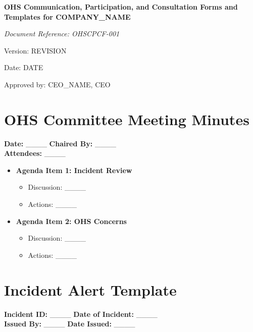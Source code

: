 \documentclass[12pt]{article}
\begin{document}
\begin{titlepage}
    \centering
    \vspace*{2cm}
    {\LARGE\bfseries OHS Communication, Participation, and Consultation Forms and Templates for {{COMPANY_NAME}}\par}
    \vspace{1cm}
    {\large\itshape Document Reference: OHSCPCF-001\par}
    \vspace{0.5cm}
    {\normalsize Version: {{REVISION}}\par}
    \vspace{0.5cm}
    {\normalsize Date: {{DATE}}\par}
    \vspace{2cm}
    {\normalsize Approved by: {{CEO_NAME}}, CEO\par}
\end{titlepage}

\section{OHS Committee Meeting Minutes}

\textbf{Date:} \_\_\_\_ \textbf{Chaired By:} \_\_\_\_\\
\textbf{Attendees:} \_\_\_\_

\begin{itemize}
    \item \textbf{Agenda Item 1: Incident Review}
        \begin{itemize}
            \item Discussion: \_\_\_\_
            \item Actions: \_\_\_\_
        \end{itemize}
    \item \textbf{Agenda Item 2: OHS Concerns}
        \begin{itemize}
            \item Discussion: \_\_\_\_
            \item Actions: \_\_\_\_
        \end{itemize}
\end{itemize}

\section{Incident Alert Template}

\textbf{Incident ID:} \_\_\_\_ \textbf{Date of Incident:} \_\_\_\_\\
\textbf{Issued By:} \_\_\_\_ \textbf{Date Issued:} \_\_\_\_
\end{document}
